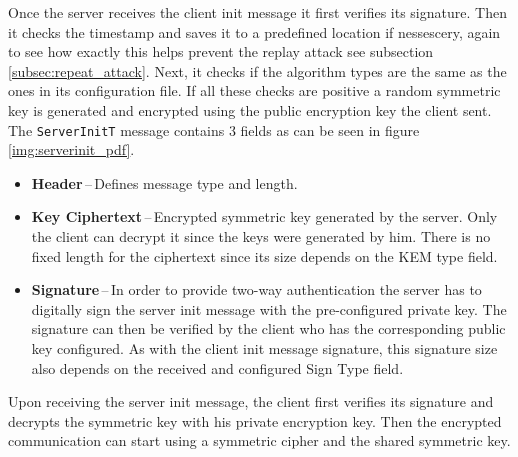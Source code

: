 Once the server receives the client init message it first verifies its signature. Then it checks the timestamp and saves it to a predefined location if nessescery, again to see how exactly this helps prevent the replay attack see subsection \ref{subsec:repeat_attack}. Next, it checks if the algorithm types are the same as the ones in its configuration file. If all these checks are positive a random symmetric key is generated and encrypted using the public encryption key the client sent. The \texttt{ServerInitT} message contains 3 fields as can be seen in figure \ref{img:serverinit_pdf}.
\begin{itemize}
  \item \textbf{Header}\,--\,Defines message type and length.
  \item \textbf{Key Ciphertext}\,--\,Encrypted symmetric key generated by the server. Only the client can decrypt it since the keys were generated by him. There is no fixed length for the ciphertext since its size depends on the KEM type field.
  \item \textbf{Signature}\,--\,In order to provide two-way authentication the server has to digitally sign the server init message with the pre-configured private key. The signature can then be verified by the client who has the corresponding public key configured. As with the client init message signature, this signature size also depends on the received and configured Sign Type field.
\end{itemize}

Upon receiving the server init message, the client first verifies its signature and decrypts the symmetric key with his private encryption key. Then the encrypted communication can start using a symmetric cipher and the shared symmetric key.
